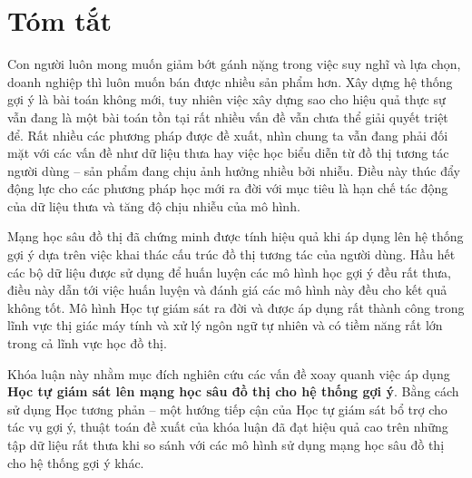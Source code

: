 \chapter*{Tóm tắt}
\label{summary}

\noindent Con người luôn mong muốn giảm bớt gánh nặng trong việc suy nghĩ và lựa chọn, doanh nghiệp thì luôn muốn bán được nhiều sản phẩm hơn. Xây dựng hệ thống gợi ý là bài toán không mới, tuy nhiên việc xây dựng sao cho hiệu quả thực sự vẫn đang là một bài toán tồn tại rất nhiều vấn đề vẫn chưa thể giải quyết triệt để. Rất nhiều các phương pháp được đề xuất, nhìn chung ta vẫn đang phải đối mặt với các vấn đề như dữ liệu thưa hay việc học biểu diễn từ đồ thị tương tác người dùng -- sản phẩm đang chịu ảnh hưởng nhiều bởi nhiễu. Điều này thúc đẩy động lực cho các phương pháp học mới ra đời với mục tiêu là hạn chế tác động của dữ liệu thưa và tăng độ chịu nhiễu của mô hình.

Mạng học sâu đồ thị đã chứng minh được tính hiệu quả khi áp dụng lên hệ thống gợi ý dựa trên việc khai thác cấu trúc đồ thị tương tác của người dùng. Hầu hết các bộ dữ liệu được sử dụng để huấn luyện các mô hình học gợi ý đều rất thưa, điều này dẫn tới việc huấn luyện và đánh giá các mô hình này đều cho kết quả không tốt. Mô hình Học tự giám sát ra đời và được áp dụng rất thành công trong lĩnh vực thị giác máy tính và xử lý ngôn ngữ tự nhiên và có tiềm năng rất lớn trong cả lĩnh vực học đồ thị.

Khóa luận này nhằm mục đích nghiên cứu các vấn đề xoay quanh việc áp dụng \textbf{Học tự giám sát lên mạng học sâu đồ thị cho hệ thống gợi ý}. Bằng cách sử dụng Học tương phản -- một hướng tiếp cận của Học tự giám sát bổ trợ cho tác vụ gợi ý, thuật toán đề xuất của khóa luận đã đạt hiệu quả cao trên những tập dữ liệu rất thưa khi so sánh với các mô hình sử dụng mạng học sâu đồ thị cho hệ thống gợi ý khác.
